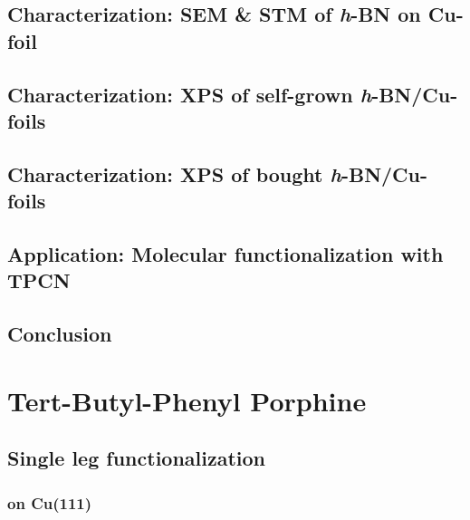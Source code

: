 \documentclass[
10pt,					%
a4paper,				%
twoside,				%
BCOR=8mm,				%
headings=normal,		%
headsepline,			%
footsepline,			%
plainfootsepline,		%
]{scrbook}
\begin{document}
  \section{Characterization: SEM \& STM of \textit{h}-BN on Cu-foil}
     
  \section{Characterization: XPS of self-grown \textit{h}-BN/Cu-foils}
     
  \section{Characterization: XPS of bought \textit{h}-BN/Cu-foils}
     
  \section{Application: Molecular functionalization with TPCN}
     
  \section{Conclusion}
     
\chapter{Tert-Butyl-Phenyl Porphine}
    
  \section{Single leg functionalization}
   \subsection{on Cu(111)}
      
\end{document}
